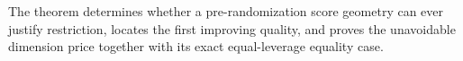 The theorem determines whether a pre-randomization score geometry can ever justify restriction, locates the first improving quality, and proves the unavoidable dimension price together with its exact equal-leverage equality case.